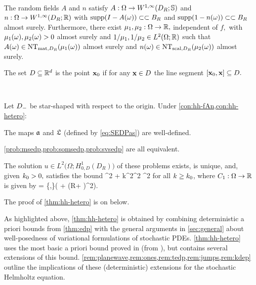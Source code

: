 
\label{con:hh-hetero}

\

\noindent The random fields $A$ and $n$ satisfy $A:\Omega\rightarrow\WoiDRRRdtd$ and $n:\Omega\rightarrow \WoiDRRR$ with $\operatorname{supp}(I-A(\omega)) \subset\subset B_{R}$ and $\operatorname{supp}(1-n(\omega)) \subset\subset B_{R}$ almost surely.  Furthermore, there exist $\mu_{1}, \mu_{2}:\Omega\rightarrow \mathbb R,$ independent of $f,$ with $\mu_{1}(\omega),\mu_{2}(\omega) > 0$ almost surely and $1/\muo,1/\mut \in \LtORR$  such that $A(\omega) \in \NTA{\muo(\omega)}$ almost surely and $n(\omega) \in \NTn{\mut(\omega)}$ almost surely.
\econ


The set $D \subseteq \mathbb R^{d}$ is  the point $\mathbf{x}_{0}$ if for any $\mathbf{x} \in D$ the line segment $\mleft[\bxz,\bx\mright] \subseteq D.$
\ede

\label{thm:hh-hetero}

\

\noindent Let $D_{-}$ be star-shaped with respect to the origin. Under \cref{con:hh-fAn,con:hh-hetero}:
\bit
\item The maps $\mathfrak{a}$ and $\mathfrak{L}$ (defined by \eqref{eq:SEDPas}) are well-defined.
\item \cref{prob:msedp,prob:somsedp,prob:svsedp} are all equivalent.
\item The solution $u \in %
L^2\big(\Omega;H_{0,D}^1(D_R)\big)$
of these problems exists, is unique, and, given $k_{0} > 0,$ satisfies the bound
\beq\label{eq:Sbound1}
^2 + k^2^2\leq \NLoO{\Co} ^2
\eeq
for all $k\geq k_{0}$, where $C_{1}:\Omega\rightarrow\mathbb R$ is given by
\beq\label{eq:C1}
\Co = \max\mleft\{,\mright\}\mleft( + \mleft(R+ \mright)^2\mright).
\eeq
\eit
\enth

The proof of \cref{thm:hh-hetero} is on  below.

As highlighted above, \cref{thm:hh-hetero} is obtained by combining
deterministic a priori bounds from \cref{thm:edp} with the general
arguments in \cref{sec:general} about well-posedness of variational
formulations of stochastic PDEs. \cref{thm:hh-hetero} uses the most basic a priori bound proved
in \cite{GrPeSp:19} (from \cite[Theorem 2.5]{GrPeSp:19}), but \cite{GrPeSp:19}
contains several extensions of this bound. \cref{rem:planewave,rem:ones,rem:tedp,rem:jumps,rem:kdep}
outline the implications of these (deterministic) extensions for
the stochastic Helmholtz equation.

